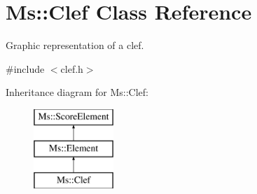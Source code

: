 \hypertarget{class_ms_1_1_clef}{}\section{Ms\+:\+:Clef Class Reference}
\label{class_ms_1_1_clef}


Graphic representation of a clef.  




{\ttfamily \#include $<$clef.\+h$>$}

Inheritance diagram for Ms\+:\+:Clef\+:\begin{figure}[H]
\begin{center}
\leavevmode
\includegraphics[height=3.000000cm]{class_ms_1_1_clef}
\end{center}
\end{figure}
